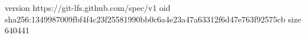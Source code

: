 version https://git-lfs.github.com/spec/v1
oid sha256:1349987009fbf4f4c23f25581990bb0c6a4e23a47a63312f6d47e763f92575cb
size 640441
